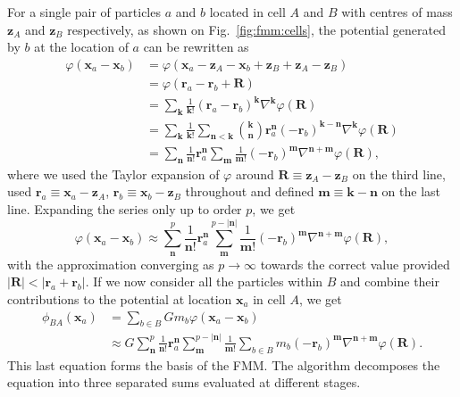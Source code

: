 For a single pair of particles $a$ and $b$ located in cell $A$ and $B$
with centres of mass $\mathbf{z}_A$ and  $\mathbf{z}_B$
respectively, as shown on Fig.~\ref{fig:fmm:cells}, the potential
generated by $b$ at the location of $a$ can be rewritten as
\begin{align}
  \varphi(\mathbf{x}_a - \mathbf{x}_b)
  &= \varphi\left(\mathbf{x}_a - \mathbf{z}_A - \mathbf{x}_b +
  \mathbf{z}_B + \mathbf{z}_A - \mathbf{z}_B\right)  \nonumber \\
  &= \varphi\left(\mathbf{r}_a - \mathbf{r}_b + \mathbf{R}\right)
  \nonumber \\
  &= \sum_\mathbf{k} \frac{1}{\mathbf{k}!} \left(\mathbf{r}_a -
  \mathbf{r}_b\right)^{\mathbf{k}} \nabla^{\mathbf{k}}\varphi(\mathbf{R})
  \nonumber \\
  &= \sum_\mathbf{k} \frac{1}{\mathbf{k}!} \sum_{\mathbf{n} <
    \mathbf{k}} \binom{\mathbf{k}}{\mathbf{n}} \mathbf{r}_a^{\mathbf{n}}
  \left(-\mathbf{r}_b\right)^{\mathbf{k} - \mathbf{n}}
  \nabla^{\mathbf{k}}\varphi(\mathbf{R})\nonumber \\
  &= \sum_\mathbf{n} \frac{1}{\mathbf{n}!} \mathbf{r}_a^{\mathbf{n}}
  \sum_\mathbf{m} \frac{1}{\mathbf{m}!}
  \left(-\mathbf{r}_b\right)^\mathbf{m} \nabla^{\mathbf{n}+\mathbf{m}} \varphi(\mathbf{R}),
\end{align}
where we used the Taylor expansion of $\varphi$ around $\mathbf{R} \equiv
\mathbf{z}_A - \mathbf{z}_B$ on the third line, used $\mathbf{r}_a
\equiv \mathbf{x}_a - \mathbf{z}_A$, $\mathbf{r}_b \equiv \mathbf{x}_b
- \mathbf{z}_B$ throughout and defined $\mathbf{m} \equiv
\mathbf{k}-\mathbf{n}$ on the last line. Expanding the series only up
to order $p$, we get
\begin{equation}
  \varphi(\mathbf{x}_a - \mathbf{x}_b) \approx \sum_{\mathbf{n}}^{p}
  \frac{1}{\mathbf{n}!} \mathbf{r}_a^{\mathbf{n}} \sum_{\mathbf{m}}^{p
    -|\mathbf{n}|} 
  \frac{1}{\mathbf{m}!} \left(-\mathbf{r}_b\right)^\mathbf{m}
  \nabla^{\mathbf{n}+\mathbf{m}} \varphi(\mathbf{R}),
  \label{eq:fmm:fmm_one_part}
\end{equation}
with the approximation converging as $p\rightarrow\infty$ towards the
correct value provided $|\mathbf{R}|<|\mathbf{r}_a +
\mathbf{r}_b|$. If we now consider all the particles within $B$ and
combine their contributions to the potential at location
$\mathbf{x}_a$ in cell $A$, we get
\begin{align}
  \phi_{BA}(\mathbf{x}_a) &= \sum_{b\in B}G m_b\varphi(\mathbf{x}_a -
  \mathbf{x}_b)  \label{eq:fmm:fmm_one_cell}  \\
  &\approx G\sum_{\mathbf{n}}^{p}
  \frac{1}{\mathbf{n}!} \mathbf{r}_a^{\mathbf{n}} \sum_{\mathbf{m}}
    ^{p -|\mathbf{n}|}
  \frac{1}{\mathbf{m}!} \sum_{b\in B} m_b\left(-\mathbf{r}_b\right)^\mathbf{m}
  \nabla^{\mathbf{n}+\mathbf{m}} \varphi(\mathbf{R}) \nonumber. 
\end{align}
This last equation forms the basis of the FMM. The algorithm
decomposes the equation into three separated sums evaluated at
different stages.\\

